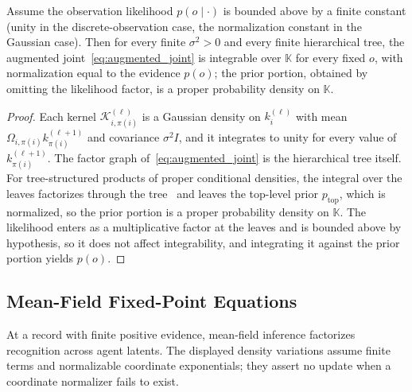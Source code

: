 \begin{lemma}
\label{lem:aug_joint_welldefined}
Assume the observation likelihood $p(o \mid \cdot)$ is bounded above by a finite constant (unity in the discrete-observation case, the normalization constant in the Gaussian case). Then for every finite $\sigma^2 > 0$ and every finite hierarchical tree, the augmented joint~\eqref{eq:augmented_joint} is integrable over $\mathbb{K}$ for every fixed $o$, with normalization equal to the evidence $p(o)$; the prior portion, obtained by omitting the likelihood factor, is a proper probability density on $\mathbb{K}$.
\end{lemma}

\begin{proof}
Each kernel $\mathcal{K}_{i,\pi(i)}^{(\ell)}$ is a Gaussian density on $k_i^{(\ell)}$ with mean $\Omega_{i,\pi(i)} k_{\pi(i)}^{(\ell+1)}$ and covariance $\sigma^2 I$, and it integrates to unity for every value of $k_{\pi(i)}^{(\ell+1)}$. The factor graph of~\eqref{eq:augmented_joint} is the hierarchical tree itself. For tree-structured products of proper conditional densities, the integral over the leaves factorizes through the tree~\cite[\S3.2]{Lauritzen1996} and leaves the top-level prior $p_{\mathrm{top}}$, which is normalized, so the prior portion is a proper probability density on $\mathbb{K}$. The likelihood enters as a multiplicative factor at the leaves and is bounded above by hypothesis, so it does not affect integrability, and integrating it against the prior portion yields $p(o)$.
\end{proof}

\subsection{Mean-Field Fixed-Point Equations}

At a record with finite positive evidence, mean-field inference factorizes recognition across agent latents. The displayed density variations assume finite terms and normalizable coordinate exponentials; they assert no update when a coordinate normalizer fails to exist.

